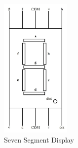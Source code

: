 \documentclass[conference]{IEEEtran}
\begin{document}
\begin{figure}[htbp]                           
\centering                                 
\includegraphics[width=0.3\textwidth]{IMG-20241119-WA0005.jpg}                                           
\caption{\label{fig-2:Gates} Seven Segment Display}               
\end{figure}
\end{document}
